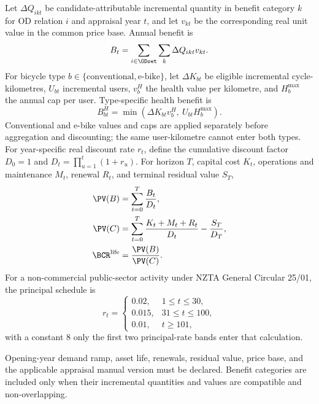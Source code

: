 Let $\Delta Q_{ikt}$ be candidate-attributable incremental quantity in benefit
category $k$ for OD relation $i$ and appraisal year $t$, and let $v_{kt}$ be the
corresponding real unit value in the common price base. Annual benefit is
\begin{equation}
B_t=\sum_{i\in\ODset}\sum_k \Delta Q_{ikt}v_{kt}.
\label{eq:annual-benefit}
\end{equation}
For bicycle type $b\in\{\mathrm{conventional},\mathrm{e\mbox{-}bike}\}$, let
$\Delta K_{bt}$ be eligible incremental cycle-kilometres, $U_{bt}$ incremental
users, $v_b^H$ the health value per kilometre, and $H_b^{\max}$ the annual cap
per user. Type-specific health benefit is
\begin{equation}
B_{bt}^{H}
=\min\!\left(\Delta K_{bt}v_b^H,\ U_{bt}H_b^{\max}\right).
\label{eq:health-cap}
\end{equation}
Conventional and e-bike values and caps are applied separately before
aggregation and discounting; the same user-kilometre cannot enter both types.
For year-specific real discount rate $r_t$, define the cumulative discount
factor $D_0=1$ and $D_t=\prod_{u=1}^{t}(1+r_u)$. For horizon $T$, capital cost
$K_t$, operations and maintenance $M_t$, renewal $R_t$, and terminal residual
value $S_T$,
\begin{align}
\PV(B)
 &=\sum_{t=0}^{T}\frac{B_t}{D_t},
\label{eq:pv-benefit}\\
\PV(C)
 &=\sum_{t=0}^{T}\frac{K_t+M_t+R_t}{D_t}
 -\frac{S_T}{D_T},
\label{eq:pv-cost}\\
\BCR^{\mathrm{life}}
 &=\frac{\PV(B)}{\PV(C)}.
\label{eq:lifecycle-bcr}
\end{align}
For a non-commercial public-sector activity under NZTA General Circular 25/01,
the principal schedule is
\begin{equation}
r_t=
\begin{cases}
0.02, & 1\le t\le30,\\
0.015, & 31\le t\le100,\\
0.01, & t\ge101,
\end{cases}
\label{eq:discount-schedule}
\end{equation}
with a constant 8%
only the first two principal-rate bands enter that calculation.

Opening-year demand ramp, asset life, renewals, residual value, price base, and
the applicable appraisal manual version must be declared. Benefit categories
are included only when their incremental quantities and values are compatible
and non-overlapping.

